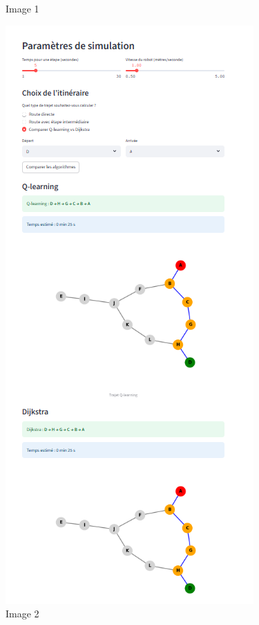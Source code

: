 \documentclass{article}
\begin{document}
\begin{figure}[htbp]
\begin{minipage}[b]{0.45\textwidth}
    \caption{Image 1}
    \label{fig:image1}
  \end{minipage}
  \hfill
  \begin{minipage}[b]{0.45\textwidth}
    \centering
    \includegraphics[width=\textwidth]{image6.png}
    \caption{Image 2}
    \label{fig:image2}
  \end{minipage}
\end{figure}
\end{document}
